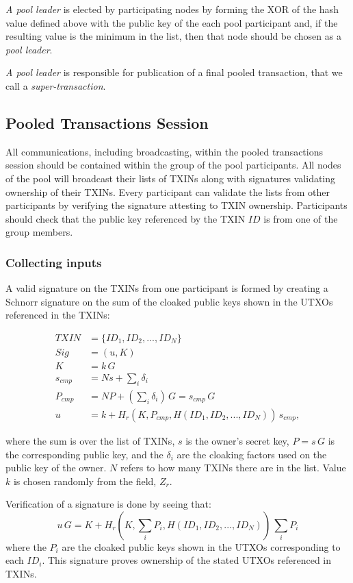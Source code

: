 \documentclass[a4paper, 10pt, conference]{ieeeconf}
\begin{document}
\textit{A pool leader} is elected by participating nodes by forming the XOR of the hash value defined above with the public key of the each pool participant and, if the resulting value is the minimum in the list, then that node should be chosen as a \textit{pool leader}.

\textit{A pool leader} is responsible for publication of a final pooled transaction, that we call a \textit{super-transaction}.

\subsection{Pooled Transactions Session}

All communications, including broadcasting, within the pooled transactions session should be contained within the group of the pool participants. All nodes of the pool will broadcast their lists of TXINs along with signatures validating ownership of their TXINs. Every participant can validate the lists from other participants by verifying the signature attesting to TXIN ownership. Participants should check that the public key referenced by the TXIN $ID$ is from one of the group members.

\subsubsection{Collecting inputs} A valid signature on the TXINs from one participant is formed by creating a Schnorr signature on the sum of the cloaked public keys shown in the UTXOs referenced in the TXINs:

\begin{align*}
TXIN &= \{ID_1, ID_2, ..., ID_N\}\\
Sig &= (u, K)\\
K &= k \, G \\
s_{cmp} &= N s + \sum_i{\delta_i}\\
P_{cmp} &= N P + (\sum_i{\delta_i})\, G = s_{cmp} \, G\\
u &= k + H_r(K, P_{cmp}, H(ID_1, ID_2, ..., ID_N)) \, s_{cmp},
\end{align*}

where the sum is over the list of TXINs, $s$ is the owner's secret key, $P = s \, G$ is the corresponding public key, and the $\delta_i$ are the cloaking factors used on the public key of the owner. $N$ refers to how many TXINs there are in the list. Value $k$ is chosen randomly from the field, $Z_r$. 

Verification of a signature is done by seeing that:
$$u \, G = K + H_r(K, \sum_i{P_i}, H(ID_1, ID_2, ..., ID_N)) \, \sum_i{P_i}$$
where the $P_i$ are the cloaked public keys shown in the UTXOs corresponding to each $ID_i$. This signature proves ownership of the stated UTXOs referenced in TXINs.
\end{document}
